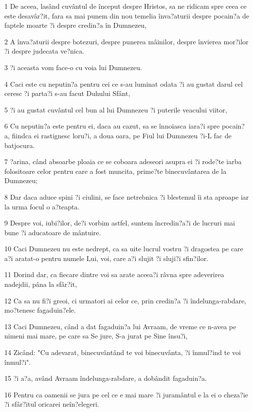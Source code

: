 \par 1 De aceea, lasând cuvântul de început despre Hristos, sa ne ridicam spre ceea ce este desavâr?it, fara sa mai punem din nou temelia înva?aturii despre pocain?a de faptele moarte ?i despre credin?a în Dumnezeu,
\par 2 A înva?aturii despre botezuri, despre punerea mâinilor, despre învierea mor?ilor ?i despre judecata ve?nica.
\par 3 ?i aceasta vom face-o cu voia lui Dumnezeu.
\par 4 Caci este cu neputin?a pentru cei ce s-au luminat odata ?i au gustat darul cel ceresc ?i parta?i s-au facut Duhului Sfânt,
\par 5 ?i au gustat cuvântul cel bun al lui Dumnezeu ?i puterile veacului viitor,
\par 6 Cu neputin?a este pentru ei, daca au cazut, sa se înnoiasca iara?i spre pocain?a, fiindca ei rastignesc loru?i, a doua oara, pe Fiul lui Dumnezeu ?i-L fac de batjocura.
\par 7 ?arina, când absoarbe ploaia ce se coboara adeseori asupra ei ?i rode?te iarba folositoare celor pentru care a fost muncita, prime?te binecuvântarea de la Dumnezeu;
\par 8 Dar daca aduce spini ?i ciulini, se face netrebnica ?i blestemul îi sta aproape iar la urma focul o a?teapta.
\par 9 Despre voi, iubi?ilor, de?i vorbim astfel, suntem încredin?a?i de lucruri mai bune ?i aducatoare de mântuire.
\par 10 Caci Dumnezeu nu este nedrept, ca sa uite lucrul vostru ?i dragostea pe care a?i aratat-o pentru numele Lui, voi, care a?i slujit ?i sluji?i sfin?ilor.
\par 11 Dorind dar, ca fiecare dintre voi sa arate aceea?i râvna spre adeverirea nadejdii, pâna la sfâr?it,
\par 12 Ca sa nu fi?i greoi, ci urmatori ai celor ce, prin credin?a ?i îndelunga-rabdare, mo?tenesc fagaduin?ele.
\par 13 Caci Dumnezeu, când a dat fagaduin?a lui Avraam, de vreme ce n-avea pe nimeni mai mare, pe care sa Se jure, S-a jurat pe Sine însu?i,
\par 14 Zicând: "Cu adevarat, binecuvântând te voi binecuvânta, ?i înmul?ind te voi înmul?i".
\par 15 ?i a?a, având Avraam îndelunga-rabdare, a dobândit fagaduin?a.
\par 16 Pentru ca oamenii se jura pe cel ce e mai mare ?i juramântul e la ei o cheza?ie ?i sfâr?itul oricarei neîn?elegeri.
